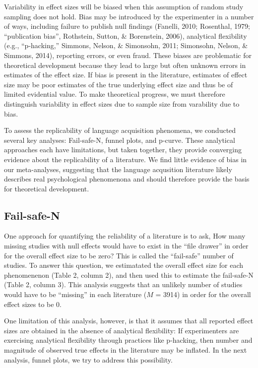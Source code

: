 \documentclass[american,floatsintext,man]{apa6}
\begin{document}
Variability in effect sizes will be biased when this assumption of
random study sampling does not hold. Bias may be introduced by the
experimenter in a number of ways, including failure to publish null
findings (Fanelli, 2010; Rosenthal, 1979; ``publication bias'',
Rothstein, Sutton, \& Borenstein, 2006), analytical flexibility (e.g.,
``p-hacking,'' Simmons, Nelson, \& Simonsohn, 2011; Simonsohn, Nelson,
\& Simmons, 2014), reporting errors, or even fraud. These biases are
problematic for theoretical development because they lead to large but
often unknown errors in estimates of the effect size. If bias is present
in the literature, estimates of effect size may be poor estimates of the
true underlying effect size and thus be of limited evidential value. To
make theoretical progress, we must therefore distinguish variability in
effect sizes due to sample size from varability due to bias.

To assess the replicability of language acquisition phenomena, we
conducted several key analyses: Fail-safe-N, funnel plots, and p-curve.
These analytical approaches each have limitations, but taken together,
they provide converging evidence about the replicability of a
literature. We find little evidence of bias in our meta-analyses,
suggesting that the language acqusition literature likely describes real
psychological phenomenona and should therefore provide the basis for
theoretical development.

\subsection{Fail-safe-N}\label{fail-safe-n}

One approach for quantifying the reliability of a literature is to ask,
How many missing studies with null effects would have to exist in the
\enquote{file drawer} in order for the overall effect size to be zero?
This is called the \enquote{fail-safe} number of studies. To answer this
question, we estimatated the overall effect size for each phenomenenon
(Table 2, column 2), and then used this to estimate the fail-safe-N
(Table 2, column 3). This analysis suggests that an unlikely number of
studies would have to be \enquote{missing} in each literature (\(M\) =
3914) in order for the overall effect sizes to be 0.

One limitation of this analysis, however, is that it assumes that all
reported effect sizes are obtained in the absence of analytical
flexibility: If experimenters are exercising analytical flexibility
through practices like p-hacking, then number and magnitude of observed
true effects in the literature may be inflated. In the next analysis,
funnel plots, we try to address this possibility.
\end{document}

